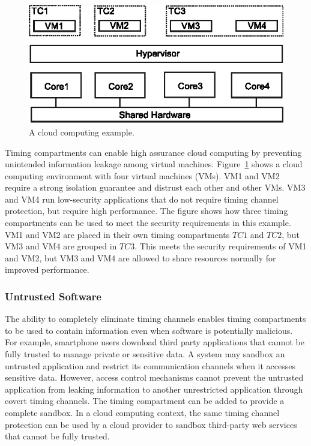 \begin{figure}
    \begin{center}
        \includegraphics{figs/cloud_tcs.eps}
        \caption{A cloud computing example.} %
        \label{fig:cloud_tcs}
    \end{center}
\end{figure}

Timing compartments can enable high assurance cloud computing by preventing
unintended information leakage among virtual machines.
Figure~\ref{fig:cloud_tcs} shows a cloud computing environment with four virtual 
machines (VMs).
VM1 and VM2 require a strong isolation guarantee and distrust each other and 
other VMs.
VM3 and VM4 run low-security applications that do not require timing channel 
protection, but require high performance. The figure shows how three timing 
compartments can be used to meet the security requirements in this example.
VM1 and VM2 are placed in their own timing compartments $TC1$ and $TC2$, but VM3 
and VM4 are grouped in $TC3$. 
This meets the 
security requirements of VM1 and VM2, but VM3 and VM4 are allowed to share 
resources normally for improved performance.


\subsubsection{Untrusted Software} 

The ability to completely eliminate timing channels enables timing compartments
to be used to contain information even when software is potentially malicious.
For example, smartphone users download third party applications
that cannot be fully trusted to manage private or sensitive data. A system may
sandbox an untrusted application and restrict its communication channels
when it accesses sensitive data. However, access control mechanisms cannot
prevent the untrusted application from leaking information to another 
unrestricted
application through covert timing channels. The timing compartment can 
be added to provide a complete sandbox.  In a cloud computing
context, the same timing channel protection can be used
by a cloud provider to sandbox third-party web services that cannot be fully 
trusted.

